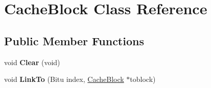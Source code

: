 \hypertarget{classCacheBlock}{\section{Cache\-Block Class Reference}
\label{classCacheBlock}
}
\subsection*{Public Member Functions}
\begin{DoxyCompactItemize}
\item 
\hypertarget{classCacheBlock_afcdcd522a40f9c808ac26406c2f12901}{void {\bfseries Clear} (void)}\label{classCacheBlock_afcdcd522a40f9c808ac26406c2f12901}

\item 
\hypertarget{classCacheBlock_a610365df6177ab1cc403e114cb2f6d58}{void {\bfseries Link\-To} (Bitu index, \hyperlink{classCacheBlock}{Cache\-Block} $\ast$toblock)}\label{classCacheBlock_a610365df6177ab1cc403e114cb2f6d58}

\end{DoxyCompactItemize}
